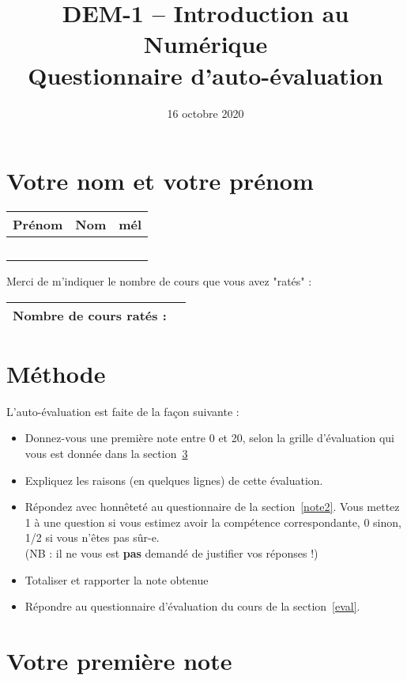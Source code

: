 \documentclass[12pt]{article}
\title{DEM-1 -- Introduction au Numérique\\
Questionnaire d'auto-évaluation}
\date{16 octobre 2020}  %
\begin{document}
\maketitle


\section{Votre nom et votre prénom}
\begin{center}
\begin{tabular}{| p{4cm} | p{4cm} | p{5cm} |}
\hline
Prénom & Nom & mél\\
\hline
~&&\\
\hline
\end{tabular}
\end{center}
Merci de m'indiquer le nombre de cours que vous avez
"ratés" :
\begin{center}
\begin{tabular}{| p{7cm} | p{1cm} |}
\hline
Nombre de cours ratés : & \\
\hline
\end{tabular}
\end{center}

\section{Méthode}

\newcommand{\pyth}{{\sc Python}}

L'auto-évaluation est faite de la façon suivante :
\begin{itemize}
\item Donnez-vous une première note entre 0 et 20, selon la grille d'évaluation
qui vous est donnée dans la section~\ref{note1}
\item Expliquez les raisons (en quelques lignes) de cette évaluation.
\item Répondez avec honnêteté au questionnaire
de la section~\ref{note2}. Vous mettez 1 à une question si vous
estimez avoir la compétence correspondante, 0 sinon, 1/2 si vous n'êtes pas sûr-e.\\
(NB : il ne vous est \textbf{pas} demandé de justifier vos réponses !)
\item Totaliser et rapporter la note obtenue
\item Répondre au questionnaire d'évaluation du cours de la section~\ref{eval}.
\end{itemize}

\newpage

\section{Votre première note}
\label{note1}
\end{document}
